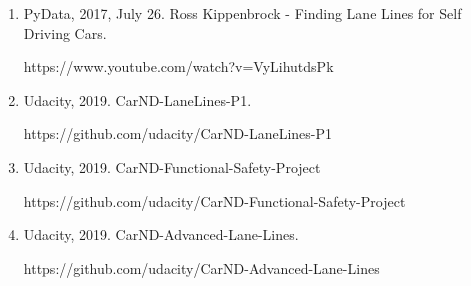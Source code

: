 \documentclass[]{article}
\begin{document}
\begin{enumerate}
  \item PyData, 2017, July 26.  Ross Kippenbrock - Finding Lane Lines for Self Driving Cars.

  https://www.youtube.com/watch?v=VyLihutdsPk

  \item Udacity, 2019.  CarND-LaneLines-P1.

  https://github.com/udacity/CarND-LaneLines-P1


  \item Udacity, 2019.  CarND-Functional-Safety-Project

  https://github.com/udacity/CarND-Functional-Safety-Project

  \item Udacity, 2019.  CarND-Advanced-Lane-Lines.

  https://github.com/udacity/CarND-Advanced-Lane-Lines


\end{enumerate}
\end{document}
